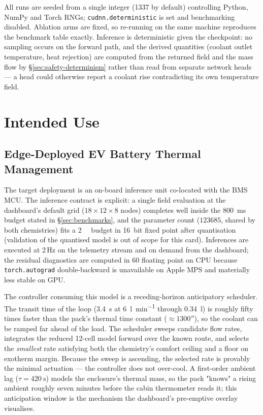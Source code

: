 \documentclass[journal,10pt,compsoc,onecolumn]{IEEEtran}
\begin{document}
\noindent
All runs are seeded from a single integer (\num{1337} by default) controlling
Python, NumPy and Torch RNGs; \texttt{cudnn.deterministic} is set and
benchmarking disabled. Ablation arms are fixed, so re-running on the same
machine reproduces the benchmark table exactly. Inference is deterministic given
the checkpoint: no sampling occurs on the forward path, and the derived
quantities (coolant outlet temperature, heat rejection) are computed from the
returned field and the mass flow by \S\ref{sec:safety-determinism} rather than
read from separate network heads --- a head could otherwise report a coolant
rise contradicting its own temperature field.

\section{Intended Use}
\label{sec:intended}

\subsection{Edge-Deployed EV Battery Thermal Management}

\noindent
The target deployment is an on-board inference unit co-located with the BMS
MCU. The inference contract is explicit: a single field evaluation at the
dashboard's default grid ($18\times12\times8$ nodes) completes well inside the
\SI{800}{\milli\second} budget stated in \S\ref{sec:benchmarks}, and the
parameter count ($\num{123685}$, shared by both chemistries) fits a
\SI{2}{\mega\byte} budget in \SI{16}{bit} fixed point after quantisation
(validation of the quantised model is out of scope for this card). Inferences
are executed at 2\,Hz on the telemetry stream and on demand from the dashboard;
the residual diagnostics are computed in \SI{60}{\bit} floating point on CPU
because \texttt{torch.autograd} double-backward is unavailable on Apple MPS and
materially less stable on GPU.

\noindent
The controller consuming this model is a receding-horizon anticipatory
scheduler. The transit time of the loop (\SI{3.4}{\second} at
\SI{6}{\litre\per\minute} through \SI{0.34}{\litre}) is roughly fifty times
faster than the pack's thermal time constant ($\approx\num{1300}{\second}$), so
the coolant can be ramped far ahead of the load. The scheduler sweeps candidate
flow rates, integrates the reduced 12-cell model forward over the known route,
and selects the \emph{smallest} rate satisfying both the chemistry's comfort
ceiling and a floor on exotherm margin. Because the sweep is ascending, the
selected rate is provably the minimal actuation --- the controller does not
over-cool. A first-order ambient lag
($\tau=\SI{420}{\second}$) models the enclosure's thermal mass, so the pack
"knows" a rising ambient roughly seven minutes before the cabin thermometer
reads it; this anticipation window is the mechanism the dashboard's
pre-emptive overlay visualises.
\end{document}
